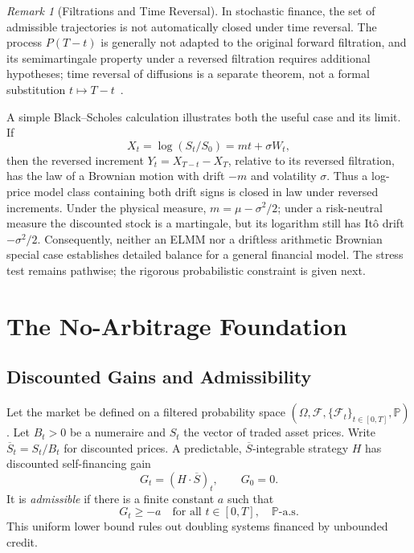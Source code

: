 \documentclass[aps,pra,reprint,superscriptaddress,amsmath,amssymb,floatfix]{revtex4-2}
\theoremstyle{plain}
\theoremstyle{definition}
\theoremstyle{remark}
\newtheorem{remark}{Remark}
\begin{document}
\begin{remark}[Filtrations and Time Reversal]
In stochastic finance, the set of admissible trajectories is not automatically
closed under time reversal. The process \(P(T-t)\) is generally not adapted to
the original forward filtration, and its semimartingale property under a
reversed filtration requires additional hypotheses; time reversal of
diffusions is a separate theorem, not a formal substitution
\(t\mapsto T-t\)~\cite{HaussmannPardoux1986}.

A simple Black--Scholes calculation illustrates both the useful case and its
limit. If
\[
  X_t=\log(S_t/S_0)=mt+\sigma W_t,
\]
then the reversed increment \(Y_t=X_{T-t}-X_T\), relative to its reversed
filtration, has the law of a Brownian motion with drift \(-m\) and volatility
\(\sigma\). Thus a log-price model class containing both drift signs is closed
in law under reversed increments. Under the physical measure,
\(m=\mu-\sigma^2/2\); under a risk-neutral measure the discounted stock is a
martingale, but its logarithm still has It\^o drift \(-\sigma^2/2\).
Consequently, neither an ELMM nor a driftless arithmetic Brownian special case
establishes detailed balance for a general financial model. The stress test
remains pathwise; the rigorous probabilistic constraint is given next.
\end{remark}

\section{The No-Arbitrage Foundation}
\label{sec:noarb}

\subsection{Discounted Gains and Admissibility}

Let the market be defined on a filtered probability space
\((\Omega,\mathcal{F},\{\mathcal{F}_t\}_{t\in[0,T]},\mathbb{P})\).
Let \(B_t>0\) be a numeraire and \(S_t\) the vector of traded asset prices.
Write \(\overline S_t=S_t/B_t\) for discounted prices. A predictable,
\(\overline S\)-integrable strategy \(H\) has discounted self-financing gain
\begin{equation}
  G_t=(H\mathbin{\cdot}\overline S)_t,\qquad G_0=0.
  \label{eq:gain}
\end{equation}
It is \emph{admissible} if there is a finite constant \(a\) such that
\begin{equation}
  G_t\geq -a\quad\text{for all }t\in[0,T],\quad\mathbb{P}\text{-a.s.}
  \label{eq:admissible}
\end{equation}
This uniform lower bound rules out doubling systems financed by unbounded
credit.
\end{document}
